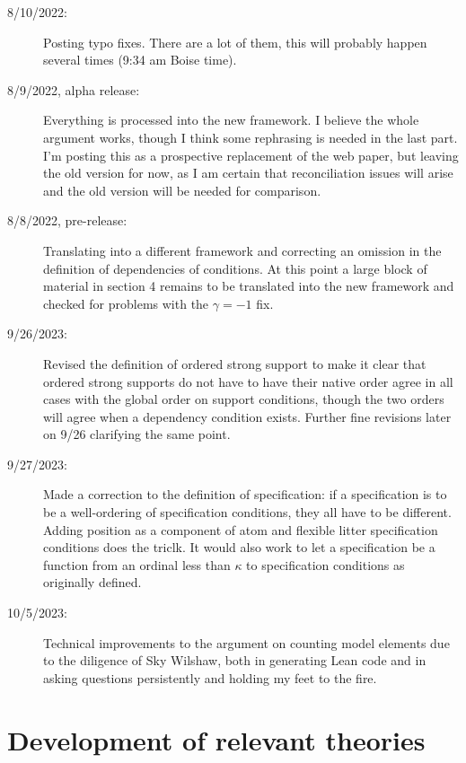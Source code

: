 \documentclass[112pt]{article}
\begin{document}
\begin{description}
\item[8/10/2022:]  Posting typo fixes.  There are a lot of them, this will probably happen several times (9:34 am Boise time).

\item[8/9/2022, alpha release:]  Everything is processed into the new framework.  I believe the whole argument works, though I think some rephrasing is needed in the last part.  I'm posting this as a prospective replacement of the web paper, but leaving the old version for now, as I am certain that reconciliation issues will arise
and the old version will be needed for comparison.

\item[8/8/2022, pre-release:]  Translating into a different framework and correcting an omission in the definition of dependencies of conditions.  At this point a large block of material in section 4 remains to be translated into the new framework and checked for problems with the $\gamma = -1$ fix.

\item[9/26/2023:]  Revised the definition of ordered strong support to make it clear that ordered strong supports do not have to have their native order agree in all cases with the global order on support conditions, though the two orders will agree when a dependency condition exists.  Further fine revisions later on 9/26 clarifying the same point.

\item[9/27/2023:]  Made a correction to the definition of specification:  if a specification is to be a well-ordering of specification conditions, they all have to be different.  Adding position as a component of atom and  flexible litter specification conditions does the triclk.  It would also work to let a specification be a function from an ordinal less than $\kappa$ to specification conditions as originally defined.
\item[10/5/2023:]  Technical improvements to the argument on counting model elements due to the diligence of Sky Wilshaw, both in generating Lean code and in asking questions persistently and holding my feet to the fire.

\end{description}


\section{Development of relevant theories}
\end{document}
